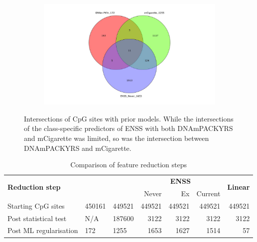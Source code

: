 \documentclass{article} %
\begin{document}
\begin{figure}[p]
    \begin{subfigure}{0.49\linewidth}
        \centering
        \includegraphics[width=\linewidth, trim=7cm 0cm 7cm 0cm, clip]{venn_diagrams/intersect_compare_never.jpg}
    \end{subfigure}
    \caption[Intersections of CpG sites with prior models]{Intersections of CpG sites with prior models. While the intersections of the class-specific predictors of ENSS with both DNAmPACKYRS and mCigarette was limited, so was the intersection between DNAmPACKYRS and mCigarette. }
    \label{fig:cpg-intersection-external}
\end{figure}

\begin{table}[p]
    \caption{Comparison of feature reduction steps} \label{table:sites-used}
    \begin{tabularx}{\textwidth}{l >{\raggedleft\arraybackslash}X >{\raggedleft\arraybackslash}X r r r r}
        \toprule
        \multirow{2}{*}{\textbf{Reduction step}} & \multirow{2}{*}{\textbf{DNAmPY}} & \multirow{2}{*}{\textbf{mCigarette}} & \multicolumn{3}{c}{\textbf{ENSS}} & \multirow{2}{*}{\textbf{Linear}}                               \\
        \cmidrule(lr){4-6}
                                                 &                                  &                                      & Never                             & Ex                               & Current      &              \\
        \midrule
        Starting CpG sites                       & \num{450161}                     & \num{449521}                         & \num{449521}                      & \num{449521}                     & \num{449521} & \num{449521} \\
        \addlinespace
        Post statistical test                    & N/A                              & \num{187600}                         & \num{3122}                        & \num{3122}                       & \num{3122}   & \num{3122}   \\
        \addlinespace
        Post ML regularisation                   & \num{172}                        & \num{1255}                           & \num{1653}                        & \num{1627}                       & \num{1514}   & \num{57}     \\
        \bottomrule
    \end{tabularx}
\end{table}
\end{document}
